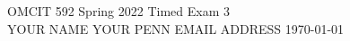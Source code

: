 \documentclass[11pt]{article}
\newcommand{\HomeworkNo}{3}
\begin{document}
\thispagestyle{firstpage}
\begin{center}
{\Large OMCIT 592 Spring 2022 \hfill Timed Exam \HomeworkNo}\\[20pt]



















YOUR NAME
\hfill
YOUR PENN EMAIL ADDRESS
\hfill
\today
\end{center}

\vspace*{1cm}
\end{document}
